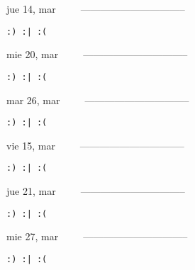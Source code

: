 \documentclass[letterpaper,10pt]{article}
\begin{document}
\begin{multicols}{3}
{jue 14, mar\ \ \ \ \ --------------------------------}
\begin{flushright}\begin{small}\texttt{:) :| :(}\end{small}\end{flushright}
\vfill
{mie 20, mar\ \ \ \ \ --------------------------------}
\begin{flushright}\begin{small}\texttt{:) :| :(}\end{small}\end{flushright}\par
\vfill
{mar 26, mar\ \ \ \ \ --------------------------------}
\begin{flushright}\begin{small}\texttt{:) :| :(}\end{small}\end{flushright}\par
\vfill
\end{multicols}
\vspace{1.05cm}

\begin{multicols}{3}
{vie 15, mar\ \ \ \ \ --------------------------------}
\begin{flushright}\begin{small}\texttt{:) :| :(}\end{small}\end{flushright}
\vfill
{jue 21, mar\ \ \ \ \ --------------------------------}
\begin{flushright}\begin{small}\texttt{:) :| :(}\end{small}\end{flushright}\par
\vfill
{mie 27, mar\ \ \ \ \ --------------------------------}
\begin{flushright}\begin{small}\texttt{:) :| :(}\end{small}\end{flushright}\par
\vfill
\end{multicols}
\vspace{1.05cm}
\end{document}
